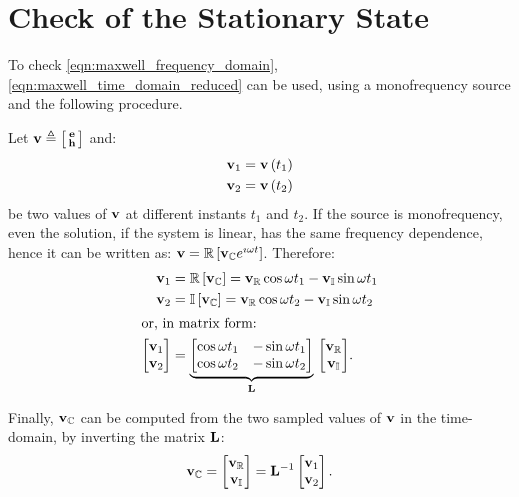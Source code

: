 \section{Check of the Stationary State}

To check \eqref{eqn:maxwell_frequency_domain},
\eqref{eqn:maxwell_time_domain_reduced} can be used, using a
monofrequency source and the following procedure.

Let $\mathbf{v} \triangleq \bigl[ \begin{smallmatrix} \mathbf{e} \\ \mathbf{h}
  \end{smallmatrix} \bigr]$ and:
\begin{align*}
  \mathbf{v}_1 & = \mathbf{v}\left(t_1\right) \\
  \mathbf{v}_2 & = \mathbf{v}\left(t_2\right)
\end{align*}
be two values of $\mathbf{v}$ at different instants $t_1$ and $t_2$. If
the source is monofrequency, even the solution, if the system is
linear, has the same frequency dependence, hence it can be written as:
$\mathbf{v} = {\mathbb{R}\left[\mathbf{v}_{\mathbb{C}} e^{\imath \omega t}\right]}$. Therefore:
\begin{align*}
  \mathbf{v}_1 & = {\mathbb{R}\left[\mathbf{v}_{\mathbb{C}}\right]} = \mathbf{v}_{\mathbb{R}}
  \cos \omega t_1 - \mathbf{v}_{\mathbb{I}} \sin \omega t_1 \\
  \mathbf{v}_2 & = {\mathbb{I}\left[\mathbf{v}_{\mathbb{C}}\right]} = \mathbf{v}_{\mathbb{R}}
  \cos \omega t_2 - \mathbf{v}_{\mathbb{I}} \sin \omega t_2 \\
\intertext{or, in matrix form:}
  \begin{bmatrix} \mathbf{v}_1 \\ \mathbf{v}_2 \end{bmatrix} & = {
    \underbrace{ \begin{bmatrix}
	\cos \omega t_1 & -\sin \omega t_1 \\
	\cos \omega t_2 & -\sin \omega t_2
      \end{bmatrix} }_{\mathbf{L}}
  \,\begin{bmatrix} \mathbf{v}_{\mathbb{R}} \\ \mathbf{v}_{\mathbb{I}} \end{bmatrix}} .
\end{align*}

Finally, $\mathbf{v}_{\mathbb{C}}$ can be computed from the two
sampled values of $\mathbf{v}$ in the time-domain, by inverting the
matrix $\mathbf{L}$:
\begin{equation*}
  \mathbf{v}_{\mathbb{C}} = \begin{bmatrix} \mathbf{v}_{\mathbb{R}} \\ \mathbf{v}_{\mathbb{I}}
  \end{bmatrix} = \mathbf{L}^{-1} \begin{bmatrix} \mathbf{v}_1 \\
    \mathbf{v}_2 \end{bmatrix} .
\end{equation*}

